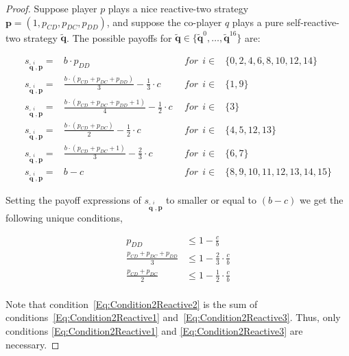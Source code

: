\documentclass{article}
\theoremstyle{definition}
\begin{document}
\begin{proof}
Suppose player $p$ plays a nice reactive-two strategy $\mathbf{p} = (1, p_{CD},
p_{DC}, p_{DD})$, and suppose the co-player $q$ plays a pure self-reactive-two
strategy $\mathbf{\tilde{q}}$. The possible payoffs for
$\mathbf{\tilde{q}} \in \{\mathbf{\tilde{q}}^{0}, \dots, \mathbf{\tilde{q}}^{16}\}$
are:

\begin{equation*}\label{Eq:PayoffExpressionsReactiveTwo}
  \begin{array}{lclc}
    s_{\mathbf{\tilde{q}}^{i}, \mathbf{p}} = & b \cdot p_{DD} & ~~for~~ i \in & \{0, 2, 4, 6, 8, 10, 12, 14\} \\ [1em]
    s_{\mathbf{\tilde{q}}^{i}, \mathbf{p}} = & \frac{b \cdot (p_{CD} + p_{DC} + p_{DD})}{3} - \frac{1}{3} \cdot c  &  ~~for~~ i \in & \{1, 9\} \\ [1em]
    s_{\mathbf{\tilde{q}}^{i}, \mathbf{p}} = & \frac{b \cdot (p_{CD} + p_{DC} + p_{DD} + 1)}{4} - \frac{1}{2} \cdot c  & ~~for~~ i \in & \{3\} \\ [1em]
    s_{\mathbf{\tilde{q}}^{i}, \mathbf{p}} = & \frac{b \cdot (p_{CD} + p_{DC})}{2} - \frac{1}{2} \cdot c  & ~~for~~ i \in & \{4, 5, 12, 13\} \\ [1em]
    s_{\mathbf{\tilde{q}}^{i}, \mathbf{p}} = & \frac{b \cdot (p_{CD} + p_{DC} + 1)}{3} - \frac{2}{3} \cdot c  &  ~~for~~ i \in & \{6, 7\}\\ [1em]
    s_{\mathbf{\tilde{q}}^{i}, \mathbf{p}} = & b - c  & ~~for~~ i \in & \{8, 9, 10, 11, 12, 13, 14, 15\}
  \end{array}
\end{equation*}

Setting the payoff expressions of $s_{\mathbf{\tilde{q}}^{i}, \mathbf{p}}$ to
smaller or equal to $(b - c)$ we get the following unique conditions,

\begin{align} 
  p_{DD} & \leq 1 - \frac{c}{b} \\ \label{Eq:Condition2Reactive1}
  \frac{p_{CD} + p_{DC} + p_{DD}}{3} & \leq 1 - \frac{2}{3} \cdot \frac{c}{b} \\ \label{Eq:Condition2Reactive2}
  \frac{p_{CD} + p_{DC}}{2} & \leq 1 - \frac{1}{2}  \cdot \frac{c}{b} \\ \label{Eq:Condition2Reactive3}
\end{align}

Note that condition~\eqref{Eq:Condition2Reactive2} is the sum of
conditions~\eqref{Eq:Condition2Reactive1} and~\eqref{Eq:Condition2Reactive3}.
Thus, only conditions \eqref{Eq:Condition2Reactive1} and
\eqref{Eq:Condition2Reactive3} are necessary.


\end{proof}
\end{document}
